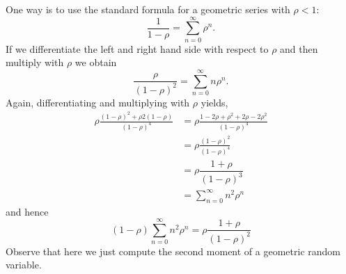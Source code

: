 \begin{exercise}
\begin{solution}
One way is to use the standard formula for a geometric series with $\rho < 1$:
\begin{equation*}
\dfrac{1}{1-\rho} = \sum_{n=0}^{\infty}\rho^n.
\end{equation*}
If we differentiate the left and right hand side with respect to
$\rho$  and then  multiply with $\rho$ we obtain
\begin{equation*}
\dfrac{\rho}{(1-\rho)^2}=\sum_{n=0}^{\infty}n\rho^n.
\end{equation*}
Again, differentiating and multiplying with $\rho$ yields, 
\begin{equation*}
  \begin{split}
\rho \frac{(1-\rho)^2 + \rho2(1-\rho)}{(1-\rho)^4} 
&= \rho \frac{1-2\rho+\rho^2 + 2\rho-2\rho^2}{(1-\rho)^4} \\
&= \rho \frac{(1-\rho)^2}{(1-\rho)^4} \\
&=\rho \dfrac{1+\rho}{(1-\rho)^3}\\
&=\sum_{n=0}^{\infty}n^2\rho^n
  \end{split}
\end{equation*}
and hence
\begin{equation*}
(1-\rho)\sum_{n=0}^{\infty}n^2\rho^n = \rho\dfrac{1+\rho}{(1-\rho)^2}
\end{equation*}
Observe that here we just compute the second moment of a geometric
random variable.



\end{solution}
\end{exercise}
